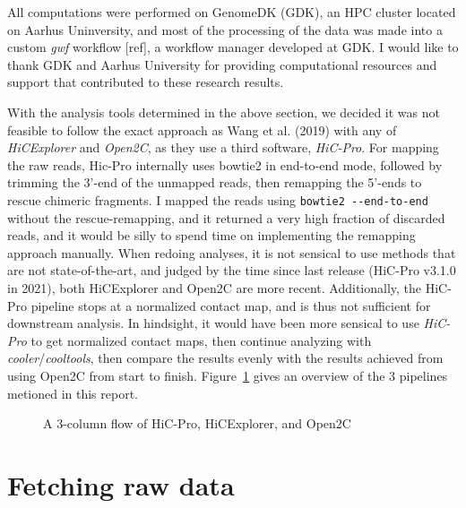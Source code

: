 \documentclass[
  11pt,
  a4paper,
]{scrbook}
\let\oldemph\emph
\renewcommand\emph[1]{\oldemph{\color{gray}#1}}
\begin{document}
All computations were performed on GenomeDK (GDK), an HPC cluster
located on Aarhus Uninversity, and most of the processing of the data
was made into a custom \emph{gwf} workflow {[}ref{]}, a workflow manager
developed at GDK. I would like to thank GDK and Aarhus University for
providing computational resources and support that contributed to these
research results.

With the analysis tools determined in the above section, we decided it
was not feasible to follow the exact approach as Wang et al. (2019) with
any of \emph{HiCExplorer} and \emph{Open2C}, as they use a third
software, \emph{HiC-Pro}. For mapping the raw reads, Hic-Pro internally
uses bowtie2 in end-to-end mode, followed by trimming the 3'-end of the
unmapped reads, then remapping the 5'-ends to rescue chimeric fragments.
I mapped the reads using \texttt{bowtie2\ -\/-end-to-end} without the
rescue-remapping, and it returned a very high fraction of discarded
reads, and it would be silly to spend time on implementing the remapping
approach manually. When redoing analyses, it is not sensical to use
methods that are not state-of-the-art, and judged by the time since last
release (HiC-Pro v3.1.0 in 2021), both HiCExplorer and Open2C are more
recent. Additionally, the HiC-Pro pipeline stops at a normalized contact
map, and is thus not sufficient for downstream analysis. In hindsight,
it would have been more sensical to use \emph{HiC-Pro} to get normalized
contact maps, then continue analyzing with
\emph{cooler}/\emph{cooltools}, then compare the results evenly with the
results achieved from using Open2C from start to finish.
Figure~\ref{fig-hic-tools-comparison} gives an overview of the 3
pipelines metioned in this report.

\begin{figure}


\caption{\label{fig-hic-tools-comparison}A 3-column flow of HiC-Pro,
HiCExplorer, and Open2C}

\end{figure}%

\section{Fetching raw data}\label{fetching-raw-data}
\end{document}
